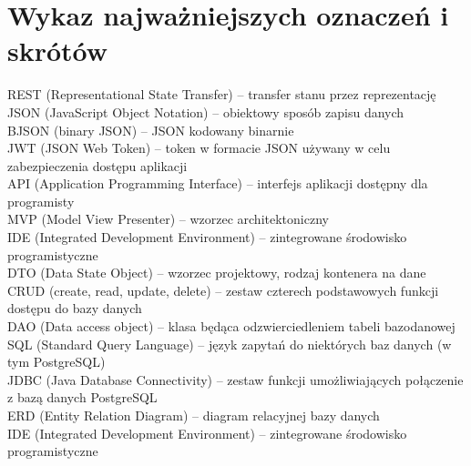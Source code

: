 \documentclass[10pt,twoside,a4paper]{report}
\begin{document}
\chapter*{Wykaz najważniejszych oznaczeń i skrótów}
\noindent REST (Representational State Transfer) -- transfer stanu przez reprezentację \\
JSON (JavaScript Object Notation) -- obiektowy sposób zapisu danych \\
BJSON (binary JSON) -- JSON kodowany binarnie \\
JWT (JSON Web Token) -- token w formacie JSON używany w celu zabezpieczenia dostępu aplikacji \\
API (Application Programming Interface) -- interfejs aplikacji dostępny dla programisty \\
MVP (Model View Presenter) -- wzorzec architektoniczny\\
IDE (Integrated Development Environment) -- zintegrowane środowisko programistyczne\\
DTO (Data State Object) -- wzorzec projektowy, rodzaj kontenera na dane\\
CRUD (create, read, update, delete) -- zestaw czterech podstawowych funkcji dostępu do bazy danych \\
DAO (Data access object) -- klasa będąca odzwierciedleniem tabeli bazodanowej \\
SQL (Standard Query Language) -- język zapytań do niektórych baz danych (w tym PostgreSQL) \\
JDBC (Java Database Connectivity) -- zestaw funkcji umożliwiających połączenie z bazą danych PostgreSQL \\
ERD (Entity Relation Diagram) -- diagram relacyjnej bazy danych \\
IDE (Integrated Development Environment) -- zintegrowane środowisko programistyczne \\
\end{document}
